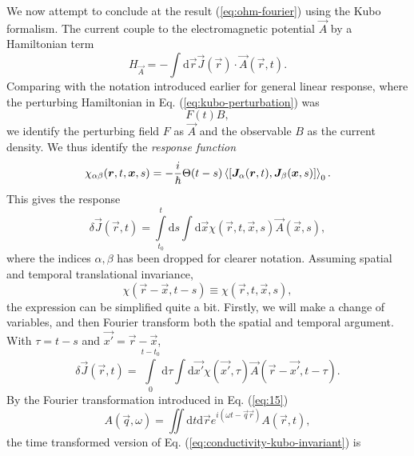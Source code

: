 We now attempt to conclude at the result (\ref{eq:ohm-fourier}) using the Kubo formalism.
The current couple to the electromagnetic potential $\vec{A}$ by a Hamiltonian term
\begin{equation}
  \label{eq:electromagnetic-coupling}
  H_{\vec{A}} = -\int \mathrm{d}\vec{r}
  \vec{J}(\vec{r}) \cdot \vec{A}(\vec{r}, t).
\end{equation}
Comparing with the notation introduced earlier for general linear response, where the perturbing Hamiltonian in Eq. (\ref{eq:kubo-perturbation}) was
\[
F(t) {B},
\]
we identify the perturbing field $F$ as $\vec{A}$ and the observable ${B}$ as the current density.
We thus identify the \emph{response function}
\begin{equation}
  \chi_{\alpha\beta}(\vec{r}, t, \vec{x}, s) = - \frac{i}{\hbar} 
  \Theta(t-s)
  \Braket{
    \left[
      \vec{J}_{\alpha}(\vec{r}, t), \vec{J}_{\beta}(\vec{x}, s)
    \right]
  }_{0}.
\end{equation}
This gives the response
\begin{equation}
  \label{eq:conductivity-kubo}
  \delta  \vec{J}(\vec{r}, t) =
  \int\limits_{t_0}^{t} \! \mathrm{d}s
  \int \mathrm{d}\vec{x}
  \chi(\vec{r}, t, \vec{x}, s)
  \vec{A}(\vec{x}, s),
\end{equation}
where the indices $\alpha, \beta$ has been dropped for clearer notation.
Assuming spatial and temporal translational invariance,
\begin{equation}
  \label{eq:response_trans_invariant}
  \chi(\vec{r}-\vec{x}, t-s) \equiv \chi(\vec{r}, t, \vec{x}, s),
\end{equation}
the expression can be simplified quite a bit.
Firstly, we will make a change of variables, and then Fourier transform both the spatial and temporal argument.
With $\tau = t-s$ and $\vec{x'} = \vec{r} - \vec{x}$,
\begin{equation}
  \label{eq:conductivity-kubo-invariant}
  \delta \vec{J}(\vec{r}, t) =
  \int\limits_0^{t-t_0} \mathrm{d}\tau
  \int \mathrm{d}\vec{x'}
  \chi(\vec{x'}, \tau)
  \vec{A}(\vec{r} - \vec{x'}, t-\tau).
\end{equation}
By the Fourier transformation introduced in Eq. (\ref{eq:15})
\[
  A(\vec{q}, \omega ) =
  \iint \mathrm{d}t \mathrm{d} \vec{r}
  e^{i(\omega  t - \vec{q} \vec{r} )}
  A(\vec{r}, t),
\]
the time transformed version of Eq. (\ref{eq:conductivity-kubo-invariant}) is 

